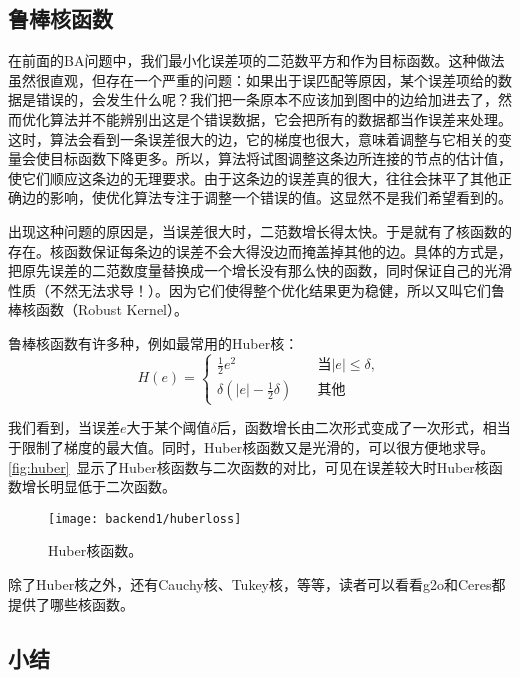 \subsection{鲁棒核函数}
在前面的BA问题中，我们最小化误差项的二范数平方和作为目标函数。这种做法虽然很直观，但存在一个严重的问题：如果出于误匹配等原因，某个误差项给的数据是错误的，会发生什么呢？我们把一条原本不应该加到图中的边给加进去了，然而优化算法并不能辨别出这是个错误数据，它会把所有的数据都当作误差来处理。这时，算法会看到一条误差很大的边，它的梯度也很大，意味着调整与它相关的变量会使目标函数下降更多。所以，算法将试图调整这条边所连接的节点的估计值，使它们顺应这条边的无理要求。由于这条边的误差真的很大，往往会抹平了其他正确边的影响，使优化算法专注于调整一个错误的值。这显然不是我们希望看到的。

出现这种问题的原因是，当误差很大时，二范数增长得太快。于是就有了核函数的存在。核函数保证每条边的误差不会大得没边而掩盖掉其他的边。具体的方式是，把原先误差的二范数度量替换成一个增长没有那么快的函数，同时保证自己的光滑性质（不然无法求导！）。因为它们使得整个优化结果更为稳健，所以又叫它们鲁棒核函数（Robust Kernel）。

鲁棒核函数有许多种，例如最常用的Huber核：
\begin{equation}
H\left( e \right) = 
\left\{ 
\begin{array}{ll}
\frac{1}{2}{e^2} &\quad \text{当} |e| \leqslant \delta, \\
\delta \left( {\left| e \right| - \frac{1}{2}\delta } \right) &\quad \text{其他}
\end{array} \right.
\end{equation}

我们看到，当误差$e$大于某个阈值$\delta$后，函数增长由二次形式变成了一次形式，相当于限制了梯度的最大值。同时，Huber核函数又是光滑的，可以很方便地求导。\autoref{fig:huber}~显示了Huber核函数与二次函数的对比，可见在误差较大时Huber核函数增长明显低于二次函数。

\begin{figure}[!htp]
	\centering
	\texttt{[image: backend1/huberloss]}
	\caption{Huber核函数。}
	\label{fig:huber}
\end{figure}

除了Huber核之外，还有Cauchy核、Tukey核，等等，读者可以看看g2o和Ceres都提供了哪些核函数。

\subsection{小结}

